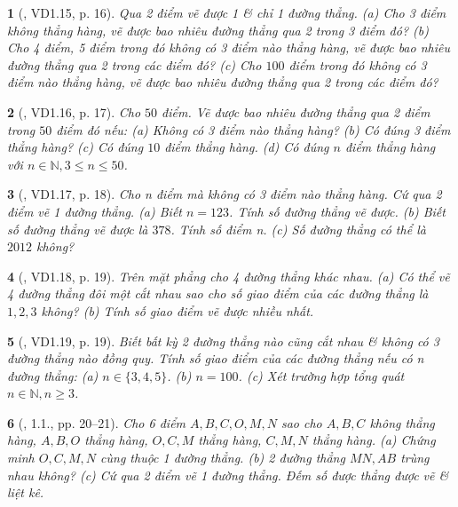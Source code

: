\documentclass{article}
\newtheorem{baitoan}{}
\begin{document}
\begin{baitoan}[\cite{TLCT_THCS_Toan_6_hinh_hoc}, VD1.15, p. 16]
	Qua 2 điểm vẽ được 1 \& chỉ 1 đường thẳng. (a) Cho 3 điểm không thẳng hàng, vẽ được bao nhiêu đường thẳng qua 2 trong 3 điểm đó? (b) Cho 4 điểm, 5 điểm trong đó không có 3 điểm nào thẳng hàng, vẽ được bao nhiêu đường thẳng qua 2 trong các điểm đó? (c) Cho $100$ điểm trong đó không có 3 điểm nào thẳng hàng, vẽ được bao nhiêu đường thẳng qua 2 trong các điểm đó?
\end{baitoan}

\begin{baitoan}[\cite{TLCT_THCS_Toan_6_hinh_hoc}, VD1.16, p. 17]
	Cho $50$ điểm. Vẽ được bao nhiêu đường thẳng qua 2 điểm trong $50$ điểm đó nếu: (a) Không có 3 điểm nào thẳng hàng? (b) Có đúng 3 điểm thẳng hàng? (c) Có đúng $10$ điểm thẳng hàng. (d) Có đúng $n$ điểm thẳng hàng với $n\in\mathbb{N},3\le n\le50$.
\end{baitoan}

\begin{baitoan}[\cite{TLCT_THCS_Toan_6_hinh_hoc}, VD1.17, p. 18]
	Cho n điểm mà không có 3 điểm nào thẳng hàng. Cứ qua 2 điểm vẽ 1 đường thẳng. (a) Biết $n = 123$. Tính số đường thẳng vẽ được. (b) Biết số đường thẳng vẽ được là $378$. Tính số điểm n. (c) Số đường thẳng có thể là $2012$ không?
\end{baitoan}

\begin{baitoan}[\cite{TLCT_THCS_Toan_6_hinh_hoc}, VD1.18, p. 19]
	Trên mặt phẳng cho 4 đường thẳng khác nhau. (a) Có thể vẽ 4 đường thẳng đôi một cắt nhau sao cho số giao điểm của các đường thẳng là $1,2,3$ không? (b) Tính số giao điểm vẽ được nhiều nhất.
\end{baitoan}

\begin{baitoan}[\cite{TLCT_THCS_Toan_6_hinh_hoc}, VD1.19, p. 19]
	Biết bất kỳ 2 đường thẳng nào cũng cắt nhau \& không có 3 đường thẳng nào đồng quy. Tính số giao điểm của các đường thẳng nếu có n đường thẳng: (a) $n\in\{3,4,5\}$. (b) $n = 100$. (c) Xét trường hợp tổng quát $n\in\mathbb{N},n\ge3$.
\end{baitoan}

\begin{baitoan}[\cite{TLCT_THCS_Toan_6_hinh_hoc}, 1.1., pp. 20--21]
	Cho 6 điểm $A,B,C,O,M,N$ sao cho $A,B,C$ không thẳng hàng, $A,B,O$ thẳng hàng, $O,C,M$ thẳng hàng, $C,M,N$ thẳng hàng. (a) Chứng minh $O,C,M,N$ cùng thuộc 1 đường thẳng. (b) 2 đường thẳng $MN,AB$ trùng nhau không? (c) Cứ qua 2 điểm vẽ 1 đường thẳng. Đếm số được thẳng được vẽ \& liệt kê.
\end{baitoan}
\end{document}
